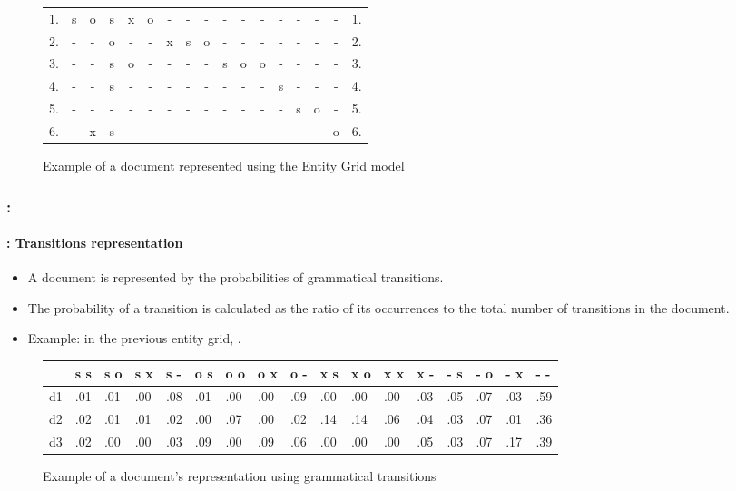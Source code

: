 \documentclass[xcolor=table]{beamer}
\begin{document}
\begin{frame}
\begin{figure}
{\begin{tabular}{ccccccccccccccccc}
			1. & s & o & s & x & o & - & - & - & - & - & - & - & - & - & - & 1. \\
			2. & - & - & o & - & - & x & s & o & - & - & - & - & - & - & - & 2. \\
			3. & - & - & s & o & - & - & - & - & s & o & o & - & - & - & - & 3. \\
			4. & - & - & s & - & - & - & - & - & - & - & - & s & - & - & - & 4. \\
			5. & - & - & - & - & - & - & - & - & - & - & - & - & s & o & - & 5. \\
			6. & - & x & s & - & - & - & - & - & - & - & - & - & - & - & o & 6. \\
			
		\end{tabular}}
		\caption{Example of a document represented using the Entity Grid model \cite{2008-barzilay-lapata}}
		
	\end{figure}
	
\end{frame}

\begin{frame}
	\frametitle{\insertshortsubtitle: \insertsection}
	\framesubtitle{\insertsubsection: Transitions representation}
	
	\begin{itemize}
		\item A document is represented by the probabilities of grammatical transitions.
		\item The probability of a transition is calculated as the ratio of its occurrences to the total number of transitions in the document.
		\item Example: in the previous entity grid, .
	\end{itemize}
	\begin{figure}
		{\tiny\bfseries
		\begin{tabular}{lllllllllllllllll}
			\hline
			& s s & s o & s x & s - & o s & o o & o x & o - & x s & x o & x x & x - & - s & - o & - x & - - \\
			\hline
			d1 & .01 & .01 & .00 & .08 & .01 & .00 & .00 & .09 & .00 & .00 & .00 & .03 & .05 & .07 & .03 & .59 \\
			d2 & .02 & .01 & .01 & .02 & .00 & .07 & .00 & .02 & .14 & .14 & .06 & .04 & .03 & .07 & .01 & .36 \\
			d3 & .02 & .00 & .00 & .03 & .09 & .00 & .09 & .06 & .00 & .00 & .00 & .05 & .03 & .07 & .17 & .39 \\
			\hline
		\end{tabular}}
		\caption{Example of a document's representation using grammatical transitions \cite{2008-barzilay-lapata}}
		
	\end{figure}
	
\end{frame}
\end{document}
